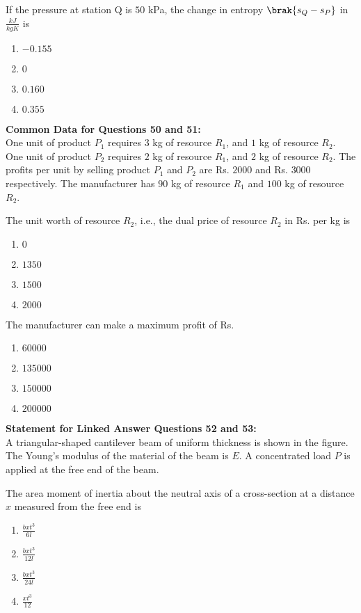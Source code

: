     \item If the pressure at station Q is $50$ kPa, the change in entropy $\brak{s_Q - s_P}$ in $\frac{kJ}{kgK}$ is
    \begin{enumerate}
        \item $-0.155$
        \item $0$
        \item $0.160$
        \item $0.355$
    \end{enumerate}

\textbf{Common Data for Questions 50 and 51:} \\
One unit of product $P_1$ requires $3$ kg of resource $R_1$, and $1$ kg of resource $R_2$. One unit of product $P_2$ requires $2$ kg of resource $R_1$, and $2$ kg of resource $R_2$. The profits per unit by selling product $P_1$ and $P_2$ are Rs. $2000$ and Rs. $3000$ respectively. The manufacturer has $90$ kg of resource $R_1$ and $100$ kg of resource $R_2$.

    \item The unit worth of resource $R_2$, i.e., the dual price of resource $R_2$ in Rs. per kg is
    \begin{enumerate}
        \item $0$
        \item $1350$
        \item $1500$
        \item $2000$
    \end{enumerate}

    \item The manufacturer can make a maximum profit of Rs.
    \begin{enumerate}
        \item $60000$
        \item $135000$
        \item $150000$
        \item $200000$
    \end{enumerate}



\textbf{Statement for Linked Answer Questions 52 and 53:} \\
A triangular-shaped cantilever beam of uniform thickness is shown in the figure. The Young's modulus of the material of the beam is $E$. A concentrated load $P$ is applied at the free end of the beam.


    \item The area moment of inertia about the neutral axis of a cross-section at a distance $x$ measured from the free end is
    \begin{enumerate}
        \item $\frac{b x t^3}{6l}$
        \item $\frac{b x t^3}{12l}$
        \item $\frac{b x t^3}{24l}$
        \item $\frac{ x t^3}{12}$
    \end{enumerate}

    

    




    




